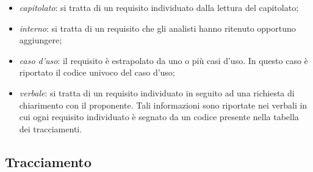 \begin{itemize}
\begin{itemize}
		\item \textit{capitolato\glo}: si tratta di un requisito individuato dalla lettura del capitolato\glo;
		\item \textit{interno}: si tratta di un requisito che gli analisti hanno ritenuto opportuno aggiungere;
		\item \textit{caso d'uso}: il requisito è estrapolato da uno o più casi d'uso. In questo caso è riportato il codice univoco del caso d'uso;
		\item \textit{verbale}: si tratta di un requisito individuato in seguito ad una richiesta di chiarimento con il proponente. Tali informazioni sono riportate nei verbali in cui ogni requisito individuato è segnato da un codice presente nella tabella dei tracciamenti.
	\end{itemize}
\end{itemize}
\renewcommand{\arraystretch}{1.5}


\pagebreak




\pagebreak
\subsection{Tracciamento}  

